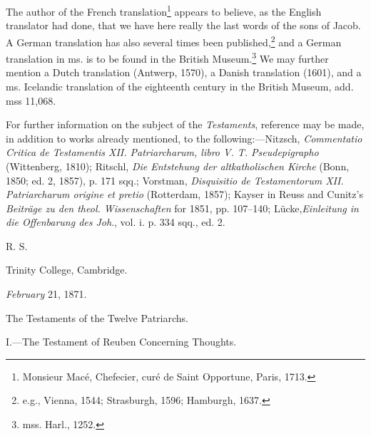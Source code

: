 The author of the French translation\footnote{Monsieur Macé, Chefecier, curé de Saint Opportune, Paris, 1713.} appears to believe, as the English translator had done, that we have here really the last words of the sons of Jacob. A German translation has also several times been published,\footnote{e.g., Vienna, 1544; Strasburgh, 1596; Hamburgh, 1637.} and a German translation in ms. is to be found in the British Museum.\footnote{mss. Harl., 1252.} We may further mention a Dutch translation (Antwerp, 1570), a Danish translation (1601), and a ms. Icelandic translation of the eighteenth century in the British Museum, add. mss 11,068.

For further information on the subject of the \emph{Testaments}, reference may be made, in addition to works already mentioned, to the following:—Nitzsch, \emph{Commentatio Critica de Testamentis XII. Patriarcharum, libro V. T. Pseudepigrapho} (Wittenberg, 1810); Ritschl, \emph{Die Entstehung der altkatholischen Kirche} (Bonn, 1850; ed. 2, 1857), p. 171 sqq.; Vorstman, \emph{Disquisitio de Testamentorum XII. Patriarcharum origine et pretio} (Rotterdam, 1857); Kayser in Reuss and Cunitz’s \emph{Beiträge zu den theol. Wissenschaften} for 1851, pp. 107–140; Lücke,\emph{Einleitung in die Offenbarung des Joh}., vol. i. p. 334 sqq., ed. 2.

R. S.

Trinity College, Cambridge.

\emph{February} 21, 1871.


The Testaments of the Twelve Patriarchs.

I.—The Testament of Reuben Concerning Thoughts.

